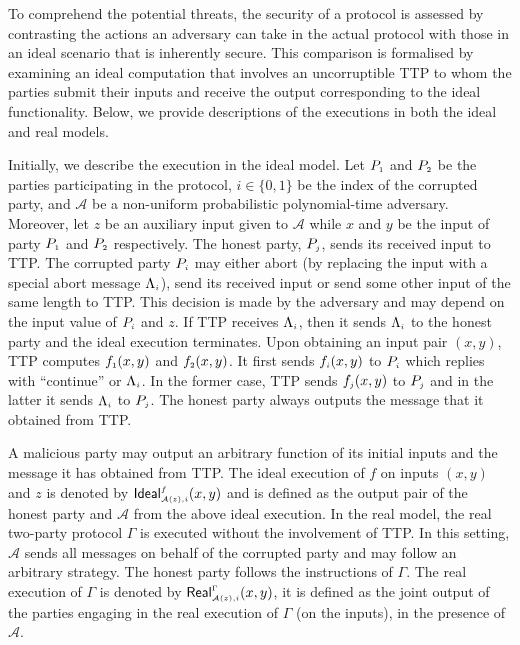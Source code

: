 To comprehend the potential threats, the security of a protocol is assessed by contrasting the actions an adversary can take in the actual protocol with those in an ideal scenario that is inherently secure. This comparison is formalised by examining an ideal computation that involves an uncorruptible TTP to whom the parties submit their inputs and receive the output corresponding to the ideal functionality. Below, we provide descriptions of the executions in both the ideal and real models.
 
Initially, we describe the execution in the ideal model. Let $P_{\scriptscriptstyle 1}$ and $P_{\scriptscriptstyle 2}$ be the parties participating in the
protocol, $i\in \{0, 1\}$ be the index of the corrupted party, and $\mathcal A$ be a non-uniform
probabilistic polynomial-time adversary. Moreover, let $z$ be an auxiliary input given to $\mathcal A$ while  $x$ and $y$ be the input of party $P_{\scriptscriptstyle 1}$ and $P_{\scriptscriptstyle 2}$  respectively.  The honest party, $P_{\scriptscriptstyle j}$, sends its received input to TTP.  The corrupted party $P_{\scriptscriptstyle i}$ may either abort (by replacing the input with a special abort message $\Lambda_{\scriptscriptstyle i}$),  send its received input or send some other input of the same length to TTP. This decision is made by the adversary and may depend on the input value of $P_{\scriptscriptstyle i}$ and $z$. If TTP receives $\Lambda_{\scriptscriptstyle i}$, then it sends $\Lambda_{\scriptscriptstyle i}$ to the honest party and the ideal execution terminates.  Upon obtaining an input pair $(x, y)$, TTP computes $f_{\scriptscriptstyle 1}(x, y)$ and $f_{\scriptscriptstyle 2}(x, y)$. It first sends $f_{\scriptscriptstyle i}(x, y)$ to  $P_{\scriptscriptstyle i}$ which replies with ``continue'' or $\Lambda_{\scriptscriptstyle i}$. In the former case, TTP sends  $f_{\scriptscriptstyle j}(x, y)$ to  $P_{\scriptscriptstyle j}$ and in the latter it sends $\Lambda_{\scriptscriptstyle i}$ to  $P_{\scriptscriptstyle j}$. The honest party always outputs the message that it obtained from TTP. 

A malicious party may output an arbitrary function of its initial inputs and the message it has obtained from TTP.  The ideal execution of $f$ on inputs $(x, y)$ and $z$ is denoted by $\mathsf{Ideal}^{\scriptscriptstyle f}_{\scriptscriptstyle\mathcal{A}(z), i}(x,y)$ and is defined as the output pair of the honest party and $\mathcal{A}$ from the above ideal execution.  In the real model, the real two-party protocol $\Gamma$ is executed
without the involvement of TTP. In this setting, $\mathcal{A}$ sends all messages on
behalf of the corrupted party and may follow an arbitrary strategy.
The honest party follows the instructions of $\Gamma$. The real execution of $\Gamma$ is denoted by $\mathsf{Real}^{\scriptscriptstyle \Gamma}_{\scriptscriptstyle\mathcal{A}(z), i}(x,y)$, it is defined as the joint output of the parties engaging in the real execution of $\Gamma$ (on the inputs), in the presence of $\mathcal{A}$.
 
